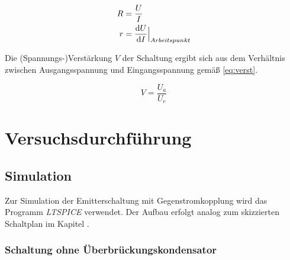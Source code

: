 \documentclass[12pt,english,ngerman]{scrartcl}
\begin{document}
\begin{align}
	R&=\frac{U}{I} \label{eq:ohm}\\
	r&= \frac{\mathrm{d}U}{\mathrm{d}I} \Bigr|_{\substack{Arbeitspunkt}}
\end{align}

Die (Spannungs-)Verstärkung $V$ der Schaltung ergibt sich aus dem Verhältnis
zwischen Ausgangsspannung und Eingangsspannung gemäß \autoref{eq:verst}.

\begin{equation}
	V=\frac{U_a}{U_e}
	\label{eq:verst}
\end{equation}

\section{Versuchsdurchführung}\label{sec:Versuchsdurchf}

\subsection{Simulation} \label{sec:Versuchsim}

Zur Simulation der Emitterschaltung mit Gegenstromkopplung wird das Programm
\textit{LTSPICE} verwendet. Der Aufbau erfolgt analog zum skizzierten Schaltplan im
Kapitel . 

\subsubsection{Schaltung ohne Überbrückungskondensator} \label{sec:Versuchohnekond}
\end{document}
